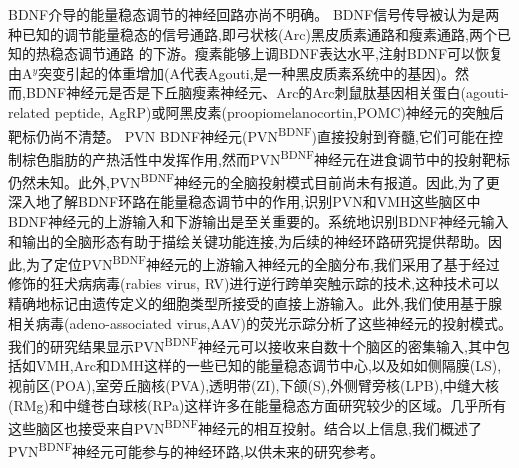 BDNF介导的能量稳态调节的神经回路亦尚不明确。 BDNF信号传导被认为是两种已知的调节能量稳态的信号通路,即弓状核(Arc)黑皮质素通路\citep{xu2003brain}和瘦素通路\citep{liao2012dendritically},两个已知的热稳态调节通路
\citep{waterson2015neuronal, krashes2016melanocortin}的下游。瘦素能够上调BDNF表达水平,注射BDNF可以恢复由A$^{y}$突变引起的体重增加(A代表Agouti,是一种黑皮质素系统中的基因)。然而,BDNF神经元是否是下丘脑瘦素神经元、Arc的Arc刺鼠肽基因相关蛋白(agouti-related peptide, AgRP)或阿黑皮素(proopiomelanocortin,POMC)神经元的突触后靶标仍尚不清楚。 PVN BDNF神经元(PVN\textsuperscript{BDNF})直接投射到脊髓,它们可能在控制棕色脂肪的产热活性中发挥作用,然而PVN\textsuperscript{BDNF}神经元在进食调节中的投射靶标仍然未知\citep{an2015discrete}。此外,PVN\textsuperscript{BDNF}神经元的全脑投射模式目前尚未有报道。因此,为了更深入地了解BDNF环路在能量稳态调节中的作用,识别PVN和VMH这些脑区中BDNF神经元的上游输入和下游输出是至关重要的。系统地识别BDNF神经元输入和输出的全脑形态有助于描绘关键功能连接,为后续的神经环路研究提供帮助。因此,为了定位PVN\textsuperscript{BDNF}神经元的上游输入神经元的全脑分布,我们采用了基于经过修饰的狂犬病病毒(rabies virus, RV)进行逆行跨单突触示踪的技术,这种技术可以精确地标记由遗传定义的细胞类型所接受的直接上游输入\citep{wickersham2007monosynaptic}。此外,我们使用基于腺相关病毒(adeno-associated virus,AAV)的荧光示踪分析了这些神经元的投射模式。我们的研究结果显示PVN\textsuperscript{BDNF}神经元可以接收来自数十个脑区的密集输入,其中包括如VMH,Arc和DMH这样的一些已知的能量稳态调节中心,以及如如侧隔膜(LS),视前区(POA),室旁丘脑核(PVA),透明带(ZI),下颌(S),外侧臂旁核(LPB),中缝大核(RMg)和中缝苍白球核(RPa)这样许多在能量稳态方面研究较少的区域。几乎所有这些脑区也接受来自PVN\textsuperscript{BDNF}神经元的相互投射。结合以上信息,我们概述了PVN\textsuperscript{BDNF}神经元可能参与的神经环路,以供未来的研究参考。
